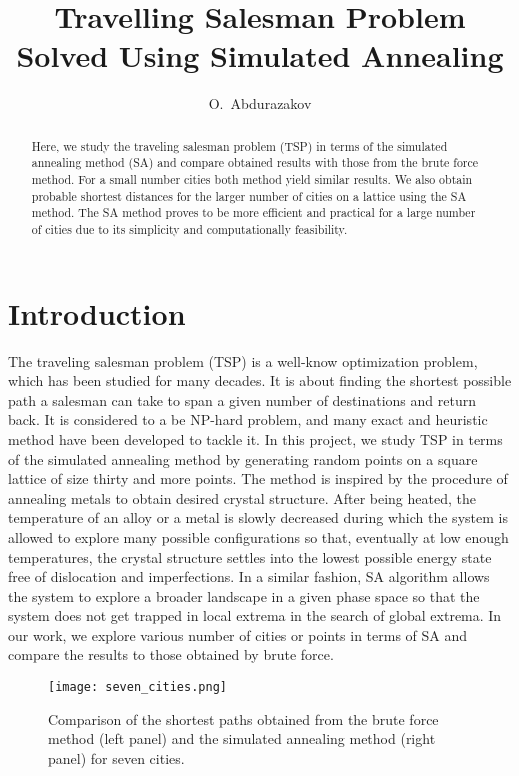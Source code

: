 \documentclass[aps,prb,twocolumn,showpacs,floatfix,superscriptaddress]{revtex4-1}
\begin{document}
\title{Travelling Salesman Problem Solved Using Simulated Annealing}
\author{O.~Abdurazakov}

\begin{abstract}
Here, we study the traveling salesman problem (TSP) in terms of the simulated annealing method (SA) and compare obtained results with those from the brute force method. For a small number cities both method yield similar results. We also obtain probable shortest distances for the larger number of cities on a lattice using the SA method. The SA method proves to be more efficient and practical for a large number of cities due to its simplicity and computationally feasibility. 
\end{abstract}

\maketitle

\section{Introduction}

The traveling salesman problem (TSP) is a well-know optimization problem, 
which has been studied for many decades. It is about finding the shortest 
possible path a salesman can take to span a given number of destinations 
and return back. It is considered to a be NP-hard problem, and many exact 
and heuristic method have been developed to tackle it. In this project, 
we study TSP in terms of the simulated annealing method by generating random points on 
a square lattice of size thirty and more points. The method is inspired by the procedure of annealing metals to obtain desired crystal structure. After being heated, the temperature of an alloy or a metal is slowly decreased during which the system is allowed to explore many possible configurations so that, eventually at low enough temperatures, the crystal structure settles into the lowest possible energy state free of dislocation and imperfections. In a similar fashion, SA algorithm allows the system to explore a broader landscape in a given phase space so that the system does not get trapped in local extrema in the search of global extrema. In our work, we explore various number of cities or points in terms of SA and compare the results to those obtained by brute force.    

\begin{figure}
        \texttt{[image: seven\_cities.png]}
        \caption{Comparison of the shortest paths obtained from the brute force method (left panel) and the simulated annealing method (right panel) for seven cities.}
        \label{fig:seven_cities}
\end{figure}
\end{document}
